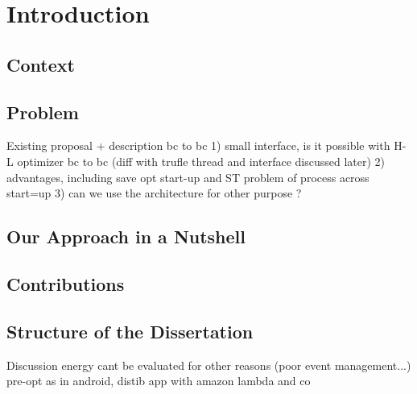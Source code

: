 \documentclass[a4paper,12pt,twoside]{../includes/ThesisStyle}
\begin{document}
\fi

\chapter{Introduction}
\label{chap:intro}
\minitoc

\section{Context}

\section{Problem}

Existing proposal + description bc to bc
1) small interface, is it possible with  H-L optimizer bc to bc (diff with trufle thread and interface discussed later)
2) advantages, including save opt start-up and ST problem of process across start=up
3) can we use the architecture for other purpose ?

\section{Our Approach in a Nutshell}

\section{Contributions}

\section{Structure of the Dissertation}

Discussion energy cant be evaluated for other reasons (poor event management...) pre-opt as in android, distib app with amazon lambda and co

\ifx\wholebook\relax\else
    
\end{document}

